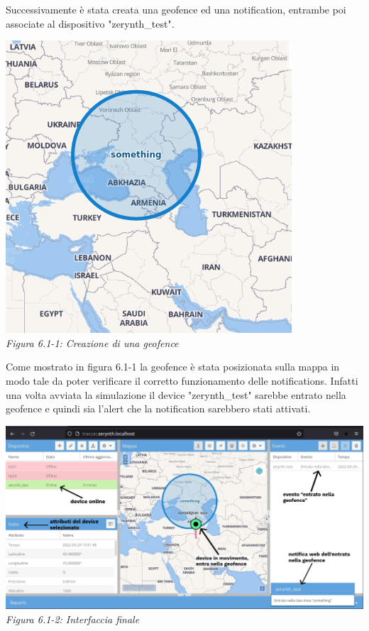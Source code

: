 \documentclass[a4paper,titlepage,12pt]{report}
\begin{document}
{Successivamente è stata creata una geofence ed una notification, entrambe poi associate al dispositivo "zerynth\_test". 

\begin{center}
\includegraphics[scale=0.61]{images/geofence.png}\\ 
\textit{Figura 6.1-1: Creazione di una geofence}
\end{center}


Come mostrato in figura 6.1-1 la geofence è stata posizionata sulla mappa in modo tale da poter verificare il corretto funzionamento delle notifications. Infatti una volta avviata la simulazione il device "zerynth\_test" sarebbe entrato nella geofence e quindi sia l'alert che la notification sarebbero stati attivati.

\begin{center}
\includegraphics[scale=1.33]{images/interfaccia_completa.jpg}\\ 
\textit{Figura 6.1-2: Interfaccia finale}
\end{center}

}
\end{document}
